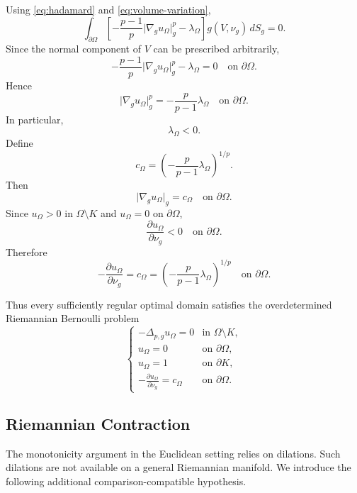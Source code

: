 \documentclass[11pt,a4paper]{article}
\theoremstyle{definition}
\theoremstyle{remark}
\newcommand{\gradg}{\nabla_g}
\newcommand{\plapg}{\Delta_{p,g}}
\newcommand{\normg}[1]{\lvert #1\rvert_g}
\begin{document}
Using \eqref{eq:hadamard} and \eqref{eq:volume-variation},
\[
\int_{\partial\Omega}
\left[
-\frac{p-1}{p}
\normg{\gradg u_\Omega}^{p}
-\lambda_\Omega
\right]
g(V,\nu_g)\,dS_g
=0.
\]
Since the normal component of $V$ can be prescribed arbitrarily,
\[
-\frac{p-1}{p}
\normg{\gradg u_\Omega}^{p}
-\lambda_\Omega
=0
\quad\text{on }\partial\Omega.
\]
Hence
\begin{equation}
\normg{\gradg u_\Omega}^{p}
=
-\frac{p}{p-1}\lambda_\Omega
\quad\text{on }\partial\Omega.
\label{eq:lambda-condition}
\end{equation}
In particular,
\[
\lambda_\Omega<0.
\]
Define
\begin{equation}
c_\Omega
=
\left(
-\frac{p}{p-1}\lambda_\Omega
\right)^{1/p}.
\label{eq:c-definition}
\end{equation}
Then
\[
\normg{\gradg u_\Omega}
=
c_\Omega
\quad\text{on }\partial\Omega.
\]
Since $u_\Omega>0$ in $\Omega\setminus K$ and
$u_\Omega=0$ on $\partial\Omega$,
\[
\frac{\partial u_\Omega}{\partial\nu_g}<0
\quad\text{on }\partial\Omega.
\]
Therefore
\begin{equation}
-\frac{\partial u_\Omega}{\partial\nu_g}
=
c_\Omega
=
\left(
-\frac{p}{p-1}\lambda_\Omega
\right)^{1/p}
\quad\text{on }\partial\Omega.
\label{eq:bernoulli-optimality}
\end{equation}

Thus every sufficiently regular optimal domain satisfies the
overdetermined Riemannian Bernoulli problem
\begin{equation}
\begin{cases}
-\plapg u_\Omega=0
&\text{in }\Omega\setminus K,\\
u_\Omega=0
&\text{on }\partial\Omega,\\
u_\Omega=1
&\text{on }\partial K,\\
-\displaystyle\frac{\partial u_\Omega}{\partial\nu_g}
=c_\Omega
&\text{on }\partial\Omega.
\end{cases}
\label{eq:optimal-overdetermined}
\end{equation}

\subsection{Riemannian Contraction }

The monotonicity argument in the Euclidean setting relies on
dilations. Such dilations are not available on a general Riemannian
manifold. We introduce the following additional
comparison-compatible hypothesis.
\end{document}
